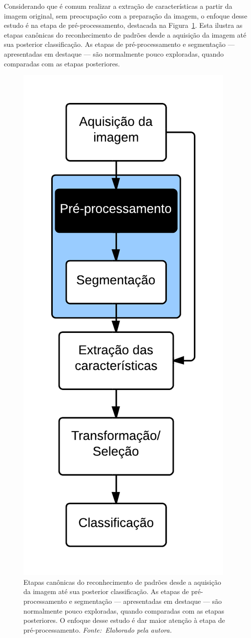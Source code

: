 
Considerando que é comum realizar a extração de características a partir da imagem original, sem preocupação com a preparação da imagem, o enfoque desse estudo é na etapa de pré-processamento, destacada na Figura~\ref{fig:fluxo}. Esta ilustra as etapas canônicas do reconhecimento de padrões desde a aquisição da imagem até sua posterior classificação. As etapas de pré-processamento e segmentação --- apresentadas em destaque --- são normalmente pouco exploradas, quando comparadas com as etapas posteriores.


\begin{figure}[!ht]
 \begin{center}
   \includegraphics[width=0.3\linewidth]{figuras/flow.png}
 \end{center}
 \caption[Etapas canônicas do reconhecimento de padrões desde a aquisição da imagem até sua posterior classificação.]{Etapas canônicas do reconhecimento de padrões desde a aquisição da imagem até sua posterior classificação. As etapas de pré-processamento e segmentação --- apresentadas em destaque --- são normalmente pouco exploradas, quando comparadas com as etapas posteriores. O enfoque desse estudo é dar maior atenção à etapa de pré-processamento. \textit{Fonte:~Elaborado pela autora.}}
 \label{fig:fluxo}
\end{figure}

\enlargethispage{-\baselineskip}

